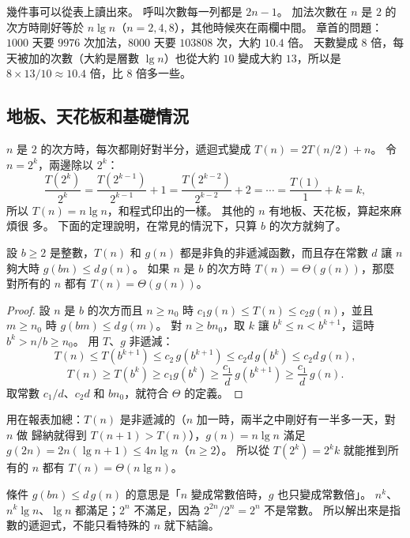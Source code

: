 幾件事可以從表上讀出來。 呼叫次數每一列都是 $2n - 1$。 加法次數在 $n$ 是 $2$ 的
次方時剛好等於 $n \lg n$（$n = 2, 4, 8$），其他時候夾在兩欄中間。 章首的問題：
$1000$ 天要 $9976$ 次加法，$8000$ 天要 $103808$ 次，大約 $10.4$ 倍。 天數變成 $8$
倍，每天被加的次數（大約是層數 $\lg n$）也從大約 $10$ 變成大約 $13$，所以是
$8 \times 13/10 \approx 10.4$ 倍，比 $8$ 倍多一些。

\subsection{地板、天花板和基礎情況}
\label{sec:rec-floors}

$n$ 是 $2$ 的次方時，每次都剛好對半分，遞迴式變成 $T(n) = 2T(n/2) + n$。 令
$n = 2^k$，兩邊除以 $2^k$：
\[
\frac{T(2^k)}{2^k} = \frac{T(2^{k-1})}{2^{k-1}} + 1
= \frac{T(2^{k-2})}{2^{k-2}} + 2 = \cdots = \frac{T(1)}{1} + k = k,
\]
所以 $T(n) = n \lg n$，和程式印出的一樣。 其他的 $n$ 有地板、天花板，算起來麻煩很
多。 下面的定理說明，在常見的情況下，只算 $b$ 的次方就夠了。

\begin{theorem}[只看 $b$ 的次方就夠]
\label{thm:rec-smooth}
設 $b \ge 2$ 是整數，$T(n)$ 和 $g(n)$ 都是非負的非遞減函數，而且存在常數 $d$ 讓
$n$ 夠大時 $g(bn) \le d\, g(n)$。 如果 $n$ 是 $b$ 的次方時 $T(n) = \Theta(g(n))$，那麼
對所有的 $n$ 都有 $T(n) = \Theta(g(n))$。
\end{theorem}

\begin{proof}
設 $n$ 是 $b$ 的次方而且 $n \ge n_0$ 時 $c_1 g(n) \le T(n) \le c_2 g(n)$，並且
$m \ge n_0$ 時 $g(bm) \le d\, g(m)$。 對 $n \ge b n_0$，取 $k$ 讓
$b^k \le n < b^{k+1}$，這時 $b^k > n/b \ge n_0$。 用 $T$、$g$ 非遞減：
\[
T(n) \le T(b^{k+1}) \le c_2\, g(b^{k+1}) \le c_2 d\, g(b^k) \le c_2 d\, g(n),
\]
\[
T(n) \ge T(b^k) \ge c_1 g(b^k) \ge \frac{c_1}{d}\, g(b^{k+1}) \ge \frac{c_1}{d}\, g(n).
\]
取常數 $c_1/d$、$c_2 d$ 和 $b n_0$，就符合 $\Theta$ 的定義。
\end{proof}

用在報表加總：$T(n)$ 是非遞減的（$n$ 加一時，兩半之中剛好有一半多一天，對 $n$ 做
歸納就得到 $T(n + 1) > T(n)$），$g(n) = n \lg n$ 滿足 $g(2n) = 2n(\lg n + 1) \le
4 n \lg n$（$n \ge 2$）。 所以從 $T(2^k) = 2^k k$ 就能推到所有的 $n$ 都有
$T(n) = \Theta(n \lg n)$。

條件 $g(bn) \le d\, g(n)$ 的意思是「$n$ 變成常數倍時，$g$ 也只變成常數倍」。
$n^k$、$n^k \lg n$、$\lg n$ 都滿足；$2^n$ 不滿足，因為 $2^{2n} / 2^n = 2^n$ 不是常數。
所以解出來是指數的遞迴式，不能只看特殊的 $n$ 就下結論。

